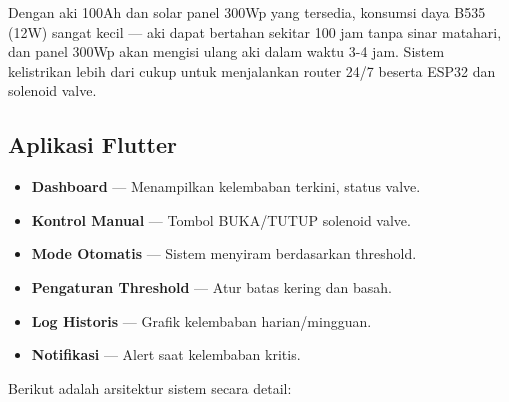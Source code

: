 \documentclass[12pt,a4paper,oneside]{report}
\begin{document}
Dengan aki 100Ah dan solar panel 300Wp yang tersedia, konsumsi daya B535 (12W) sangat kecil — aki dapat bertahan sekitar 100 jam tanpa sinar matahari, dan panel 300Wp akan mengisi ulang aki dalam waktu 3-4 jam. Sistem kelistrikan lebih dari cukup untuk menjalankan router 24/7 beserta ESP32 dan solenoid valve.

\subsection{Aplikasi Flutter}

\begin{itemize}
    \item \textbf{Dashboard} — Menampilkan kelembaban terkini, status valve.
    \item \textbf{Kontrol Manual} — Tombol BUKA/TUTUP solenoid valve.
    \item \textbf{Mode Otomatis} — Sistem menyiram berdasarkan threshold.
    \item \textbf{Pengaturan Threshold} — Atur batas kering dan basah.
    \item \textbf{Log Historis} — Grafik kelembaban harian/mingguan.
    \item \textbf{Notifikasi} — Alert saat kelembaban kritis.
\end{itemize}

\par
Berikut adalah arsitektur sistem secara detail:
\end{document}
